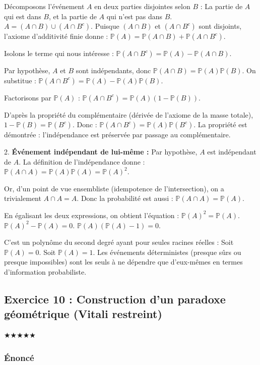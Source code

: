 \documentclass[11pt,a4paper]{article}
\begin{document}
Décomposons l'événement $A$ en deux parties disjointes selon $B$ :
La partie de $A$ qui est dans $B$, et la partie de $A$ qui n'est pas dans $B$.
$A = (A \cap B) \cup (A \cap B^c)$.
Puisque $(A \cap B)$ et $(A \cap B^c)$ sont disjoints, l'axiome d'additivité finie donne :
$\mathbb{P}(A) = \mathbb{P}(A \cap B) + \mathbb{P}(A \cap B^c)$.

Isolons le terme qui nous intéresse :
$\mathbb{P}(A \cap B^c) = \mathbb{P}(A) - \mathbb{P}(A \cap B)$.

Par hypothèse, $A$ et $B$ sont indépendants, donc $\mathbb{P}(A \cap B) = \mathbb{P}(A)\mathbb{P}(B)$. On substitue :
$\mathbb{P}(A \cap B^c) = \mathbb{P}(A) - \mathbb{P}(A)\mathbb{P}(B)$.

Factorisons par $\mathbb{P}(A)$ :
$\mathbb{P}(A \cap B^c) = \mathbb{P}(A) (1 - \mathbb{P}(B))$.

D'après la propriété du complémentaire (dérivée de l'axiome de la masse totale), $1 - \mathbb{P}(B) = \mathbb{P}(B^c)$. Donc :
$\mathbb{P}(A \cap B^c) = \mathbb{P}(A)\mathbb{P}(B^c)$.
La propriété est démontrée : l'indépendance est préservée par passage au complémentaire.

2. \textbf{Événement indépendant de lui-même :}
Par hypothèse, $A$ est indépendant de $A$. La définition de l'indépendance donne :
$\mathbb{P}(A \cap A) = \mathbb{P}(A)\mathbb{P}(A) = \mathbb{P}(A)^2$.

Or, d'un point de vue ensembliste (idempotence de l'intersection), on a trivialement $A \cap A = A$.
Donc la probabilité est aussi :
$\mathbb{P}(A \cap A) = \mathbb{P}(A)$.

En égalisant les deux expressions, on obtient l'équation :
$\mathbb{P}(A)^2 = \mathbb{P}(A)$.
$\mathbb{P}(A)^2 - \mathbb{P}(A) = 0$.
$\mathbb{P}(A) (\mathbb{P}(A) - 1) = 0$.

C'est un polynôme du second degré ayant pour seules racines réelles :
Soit $\mathbb{P}(A) = 0$.
Soit $\mathbb{P}(A) = 1$.
Les événements déterministes (presque sûrs ou presque impossibles) sont les seuls à ne dépendre que d'eux-mêmes en termes d'information probabiliste.



\subsection*{Exercice 10 : Construction d'un paradoxe géométrique (Vitali restreint)}
$\bigstar\bigstar\bigstar\bigstar\bigstar$

\subsubsection*{Énoncé}
\end{document}
